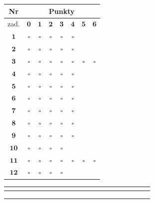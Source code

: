 \documentclass[10pt]{article}
\begin{document}
\begin{center}
\begin{tabular}{|c|c|c|c|c|c|c|c|}
\hline
Nr & \multicolumn{7}{|c|}{Punkty} \\
\hline
zad. & \(\mathbf{0}\) & \(\mathbf{1}\) & \(\mathbf{2}\) & \(\mathbf{3}\) & \(\mathbf{4}\) & \(\mathbf{5}\) & \(\mathbf{6}\) \\
\hline
\(\mathbf{1}\) & \(\square\) & \(\square\) & \(\square\) & \(\square\) & \(\square\) &  &  \\
\hline
\(\mathbf{2}\) & \(\square\) & \(\square\) & \(\square\) & \(\square\) & \(\square\) &  &  \\
\hline
\(\mathbf{3}\) & \(\square\) & \(\square\) & \(\square\) & \(\square\) & \(\square\) & \(\square\) & \(\square\) \\
\hline
\(\mathbf{4}\) & \(\square\) & \(\square\) & \(\square\) & \(\square\) & \(\square\) &  &  \\
\hline
\(\mathbf{5}\) & \(\square\) & \(\square\) & \(\square\) & \(\square\) & \(\square\) &  &  \\
\hline
\(\mathbf{6}\) & \(\square\) & \(\square\) & \(\square\) & \(\square\) & \(\square\) &  &  \\
\hline
\(\mathbf{7}\) & \(\square\) & \(\square\) & \(\square\) & \(\square\) & \(\square\) &  &  \\
\hline
\(\mathbf{8}\) & \(\square\) & \(\square\) & \(\square\) & \(\square\) & \(\square\) &  &  \\
\hline
\(\mathbf{9}\) & \(\square\) & \(\square\) & \(\square\) & \(\square\) & \(\square\) &  &  \\
\hline
\(\mathbf{1 0}\) & \(\square\) & \(\square\) & \(\square\) & \(\square\) &  &  &  \\
\hline
\(\mathbf{1 1}\) & \(\square\) & \(\square\) & \(\square\) & \(\square\) & \(\square\) & \(\square\) & \(\square\) \\
\hline
\(\mathbf{1 2}\) & \(\square\) & \(\square\) & \(\square\) & \(\square\) &  &  &  \\
\hline
\end{tabular}
\end{center}

\begin{center}
\begin{tabular}{|c|c|c|c|c|c|c|c|c|c|c|c|c|c|c|c|c|c|c|c|c|}
\hline
\multicolumn{21}{|l|}{\multirow[t]{4}{*}{}} \\
\hline
 &  &  &  &  &  &  &  &  &  &  &  &  &  &  &  &  &  &  &  &  \\
\hline
 &  &  &  &  &  &  &  &  &  &  &  &  &  &  &  &  &  &  &  &  \\
\hline
 &  &  &  &  &  &  &  &  &  &  &  &  &  &  &  &  &  &  &  &  \\
\hline
\end{tabular}
\end{center}
\end{document}
